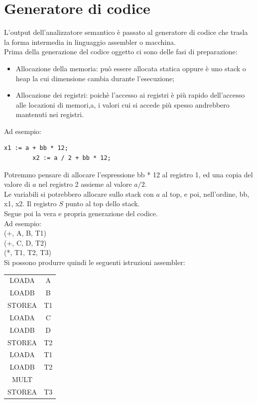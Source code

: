 \documentclass[12pt]{report}
\begin{document}
	\section{Generatore di codice}
	L'output dell'analizzatore semantico è passato al generatore di codice che trasla la forma intermedia in linguaggio assembler o macchina. \\
	Prima della generazione del codice oggetto ci sono delle fasi di preparazione:
	\begin{itemize}
		\item Allocazione della memoria: può essere allocata statica oppure è uno stack o heap la cui dimensione cambia durante l'esecuzione;
		\item Allocazione dei registri: poichè l'accesso ai registri è più rapido dell'accesso alle locazioni di memori,a, i valori cui si accede più spesso andrebbero mantenuti nei registri.
	\end{itemize}
	Ad esempio:
	\begin{lstlisting}[style=pascalstyle]
		x1 := a + bb * 12;
		x2 := a / 2 + bb * 12;
	\end{lstlisting}
	Potremmo pensare di allocare l'espressione bb * 12 al registro 1, ed una copia del valore di $a$ nel registro 2 assieme al valore $a/2$.\\
	Le variabili si potrebbero allocare sullo stack con $a$ al top, e poi, nell'ordine, bb, x1, x2. Il registro $S$ punto al top dello stack. \\
	Segue poi la vera e propria generazione del codice. \\
	Ad esempio: \\
	(+, A, B, T1) \\ (+, C, D, T2) \\ (*, T1, T2, T3) \\
	Si possono produrre quindi le seguenti istruzioni assembler:
	\begin{center}
	\begin{tabular}{c c}
		LOADA & A \\
		LOADB & B \\
		STOREA & T1 \\
		LOADA & C \\
		LOADB & D \\
		STOREA & T2 \\
		LOADA & T1 \\
		LOADB & T2 \\
		MULT & \\
		STOREA & T3
	\end{tabular}

	\end{center} \newpage
\end{document}
